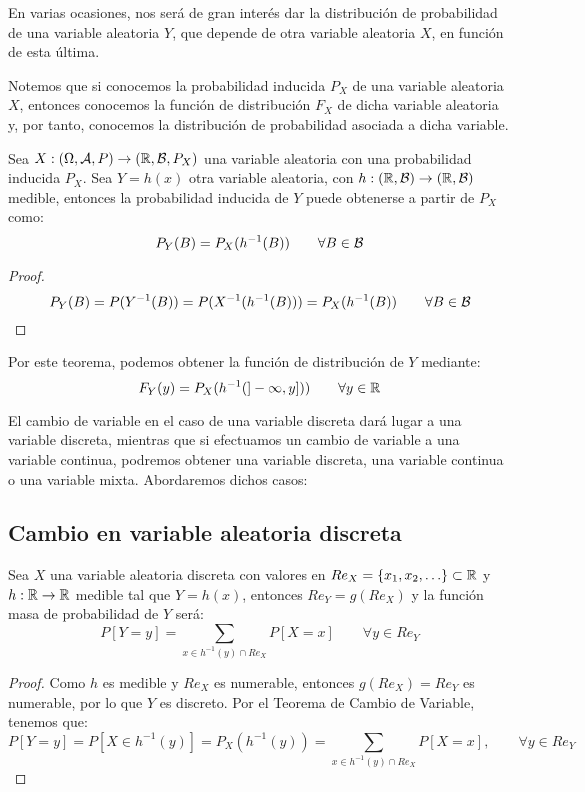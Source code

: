 En varias ocasiones, nos será de gran interés dar la distribución de probabilidad de una variable aleatoria $Y$, que depende de otra variable aleatoria $X$, en función de esta última.

Notemos que si conocemos la probabilidad inducida $P_X$ de una variable aleatoria $X$, entonces conocemos la función de distribución $F_X$ de dicha variable aleatoria y, por tanto, conocemos la distribución de probabilidad asociada a dicha variable.

\begin{teo}
  Sea $X: (\Omega, \mathcal{A}, P) \rightarrow (\mathbb R, \mathcal{B}, P_X)$ una variable aleatoria con una probabilidad inducida $P_X$.
  Sea $Y=h(x)$ otra variable aleatoria, con $h:(\mathbb R, \mathcal{B}) \rightarrow (\mathbb R, \mathcal{B})$ medible, entonces la probabilidad inducida de $Y$ puede obtenerse a partir de $P_X$ como:
  $$P_Y(B) = P_X(h^{-1}(B)) \qquad \forall B \in \mathcal{B}$$
\end{teo}
\begin{proof}
  $$P_Y(B) = P(Y^{-1}(B)) = P(X^{-1}(h^{-1}(B))) = P_X(h^{-1}(B)) \qquad \forall B \in \mathcal{B}$$
\end{proof}

Por este teorema, podemos obtener la función de distribución de $Y$ mediante:
$$F_Y(y) = P_X(h^{-1}(]-\infty, y])) \qquad \forall y\in \mathbb R$$

El cambio de variable en el caso de una variable discreta dará lugar a una variable discreta, mientras que
si efectuamos un cambio de variable a una variable continua, podremos obtener una variable discreta, una
variable continua o una variable mixta. Abordaremos dichos casos:

\subsection{Cambio en variable aleatoria discreta}\label{subsec:CV_Discreta}

\begin{coro}
    Sea $X$ una variable aleatoria discreta con valores en $Re_X=\{x_1, x_2, \ldots\} \subset \mathbb R$ y $h:\mathbb R \rightarrow \mathbb R$ medible tal que $Y=h(x)$, entonces $Re_Y=g(Re_X)$ y la función masa de probabilidad de $Y$ será:
    \begin{equation*}
        P[Y=y] = \sum_{x\in h^{-1}(y)\cap Re_X} P[X=x] \qquad \forall y \in Re_Y
    \end{equation*}
\end{coro}
\begin{proof}
    Como $h$ es medible y $Re_X$ es numerable, entonces $g(Re_X)=Re_Y$ es numerable, por lo que $Y$ es discreto. Por el Teorema de Cambio de Variable, tenemos que:
    \begin{equation*}
        P[Y=y]=P[X\in h^{-1}(y)] = P_X(h^{-1}(y)) = \sum_{x\in h^{-1}(y)\cap Re_X} P[X=x],\qquad \forall y \in Re_Y
    \end{equation*}
\end{proof}

